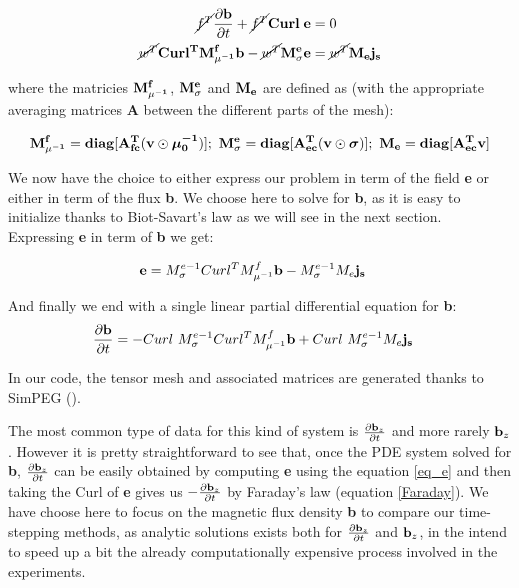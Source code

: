 \documentclass[twoside]{article}
\begin{document}
\begin{align}
\hbox{\cancel{$f^T$}}\frac{\bf{\partial b}}{\partial t} + \hbox{\cancel{$f^T$}}{\bf Curl \; e} &= 0\\
\hbox{\cancel{$w^T$}} {\bf Curl^T M_{\mu^{-1}}^f b - \hbox{\cancel{$w^T$}} M_{\sigma}^e e} &= \hbox{\cancel{$w^T$}} {\bf M_e j_s}
\end{align}

where the matricies ${\bf M_{\mu^{-1}}^f}$, ${\bf  M_{\sigma}^e}$ and ${\bf M_e}$ are defined as (with the appropriate averaging matrices \textbf{A} between the different parts of the mesh):

\begin{align}
{\bf M_{\mu^{-1}}^f = diag[A_{fc}^T (v \odot \boldsymbol{\mu_0^{-1}})]};~
{\bf M_{\sigma}^e}= {\bf diag[A_{ec}^T (v \odot \boldsymbol{\sigma})]};~
{\bf M_e = diag[A_{ec}^T v]}
\end{align}

We now have the choice to either express our problem in term of the field \textbf{e} or either in term of the flux \textbf{b}. We choose here to solve for \textbf{b}, as it is easy to initialize thanks to Biot-Savart's law as we will see in the next section. Expressing \textbf{e} in term of \textbf{b} we get:

\begin{align} \label{eq_e}
{\bf e} & = M_{\sigma}^{e-1} Curl^TM_{\mu^{-1}}^f {\bf b} - M_{\sigma}^{e-1} M_e {\bf j_s}
\end{align}

And finally we end with a single linear partial differential equation for \textbf{b}:
\begin{align}
\frac{ \partial {\bf b}}{\partial t} & = -Curl~ M_{\sigma}^{e-1} Curl^T M_{\mu^{-1}}^f {\bf b} + Curl~ M_{\sigma}^{e-1} M_e {\bf j_s}
\end{align}

In our code, the tensor mesh and associated matrices are generated thanks to SimPEG (\cite{CKH+:2015}).

The most common type of data for this kind of system is $\frac{\partial {\bf b}_z}{\partial t}$ and more rarely ${\bf b}_z$. However it is pretty straightforward to see that, once the PDE system solved for \textbf{b}, $\frac{\partial {\bf b}_z}{\partial t}$ can be easily obtained by computing \textbf{e} using the equation \ref{eq_e} and then taking the Curl of \textbf{e} gives us $-\frac{\partial {\bf b}_z}{\partial t}$ by Faraday's law (equation \ref{Faraday}).
We have choose here to focus on the magnetic flux density \textbf{b} to compare our time-stepping methods, as analytic solutions exists both for $\frac{\partial {\bf b}_z}{\partial t}$ and  ${\bf b}_z$, in the intend to speed up a bit the already computationally expensive process involved in the experiments.
\end{document}
